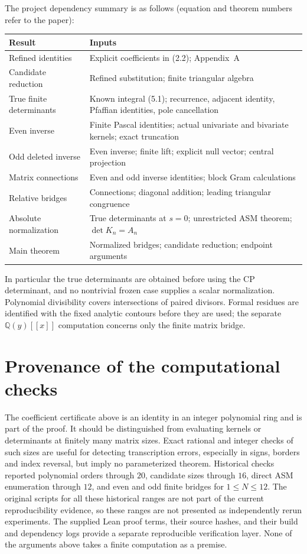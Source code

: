 \documentclass[11pt,a4paper]{article}
\newcommand{\Q}{\mathbb Q}
\begin{document}
The project dependency summary is as follows (equation and theorem numbers refer to the paper):
\begin{center}\small
\begin{tabular}{p{.27\linewidth}p{.63\linewidth}}
\toprule Result & Inputs\\\midrule
Refined identities & Explicit coefficients in (2.2); Appendix~A\\
Candidate reduction & Refined substitution; finite triangular algebra\\
True finite determinants & Known integral (5.1); recurrence, adjacent identity, Pfaffian identities, pole cancellation\\
Even inverse & Finite Pascal identities; actual univariate and bivariate kernels; exact truncation\\
Odd deleted inverse & Even inverse; finite lift; explicit null vector; central projection\\
Matrix connections & Even and odd inverse identities; block Gram calculations\\
Relative bridges & Connections; diagonal addition; leading triangular congruence\\
Absolute normalization & True determinants at $s=0$; unrestricted ASM theorem; $\det K_n=A_n$\\
Main theorem & Normalized bridges; candidate reduction; endpoint arguments\\\bottomrule
\end{tabular}
\end{center}
In particular the true determinants are obtained before using the CP determinant, and no nontrivial frozen case supplies a scalar normalization. Polynomial divisibility covers intersections of paired divisors. Formal residues are identified with the fixed analytic contours before they are used; the separate $\Q(y)[[x]]$ computation concerns only the finite matrix bridge.


\section{Provenance of the computational checks}
The coefficient certificate above is an identity in an integer polynomial ring and is part of the proof. It should be distinguished from evaluating kernels or determinants at finitely many matrix sizes. Exact rational and integer checks of such sizes are useful for detecting transcription errors, especially in signs, borders and index reversal, but imply no parameterized theorem. Historical checks reported polynomial orders through $20$, candidate sizes through $16$, direct ASM enumeration through $12$, and even and odd finite bridges for $1\le N\le12$. The original scripts for all these historical ranges are not part of the current reproducibility evidence, so these ranges are not presented as independently rerun experiments. The supplied Lean proof terms, their source hashes, and their build and dependency logs provide a separate reproducible verification layer. None of the arguments above takes a finite computation as a premise.
\end{document}
